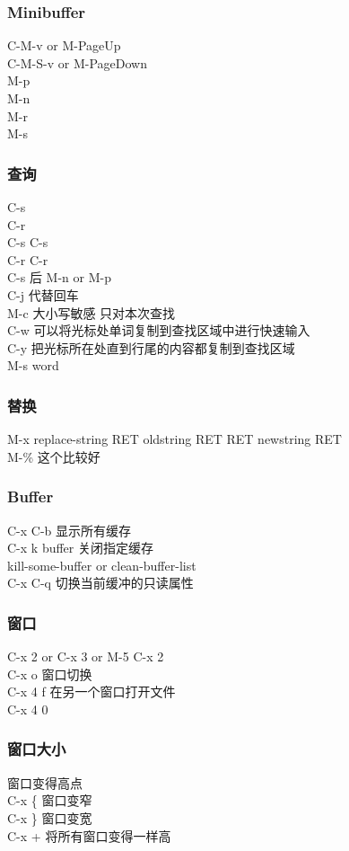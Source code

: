 \documentclass{beamer}
\begin{document}
\begin{CJK}{UTF8}{gkai}
  \begin{frame}\frametitle{Minibuffer}
    C-M-v  or M-PageUp\\
    C-M-S-v or M-PageDown\\
    M-p\\
    M-n\\
    M-r\\
    M-s\\
  \end{frame}

  \begin{frame}\frametitle{查询}
    C-s\\
    C-r\\
    C-s C-s\\
    C-r C-r\\
    C-s 后 M-n or M-p \\
    C-j 代替回车\\
    M-c 大小写敏感 只对本次查找\\
    C-w 可以将光标处单词复制到查找区域中进行快速输入\\
    C-y 把光标所在处直到行尾的内容都复制到查找区域\\
    M-s word \\
  \end{frame}

  \begin{frame}\frametitle{替换}
    M-x replace-string RET oldstring RET RET newstring RET\\
    M-\% 这个比较好\\
  \end{frame}

  \begin{frame}\frametitle{Buffer}
    C-x C-b 显示所有缓存\\
    C-x k buffer 关闭指定缓存\\
    kill-some-buffer or clean-buffer-list\\
    C-x C-q 切换当前缓冲的只读属性\\
  \end{frame}

  \begin{frame}\frametitle{窗口}
    C-x 2 or C-x 3 or M-5 C-x 2 \\
    C-x o 窗口切换\\
    C-x 4 f 在另一个窗口打开文件\\
    C-x 4 0 \\
  \end{frame}

  \begin{frame}\frametitle{窗口大小}
    窗口变得高点\\
    C-x \{ 窗口变窄\\
    C-x \} 窗口变宽\\
    C-x + 将所有窗口变得一样高\\
  \end{frame}

\end{CJK}
\end{document}
